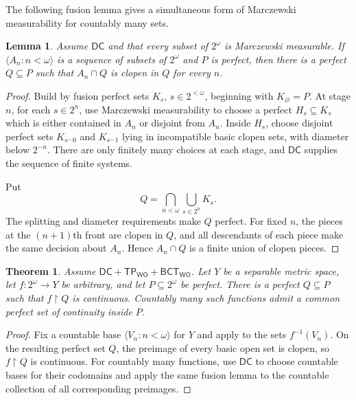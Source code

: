 \documentclass[11pt,reqno]{amsart}
\newcommand{\WO}{\mathsf{WO}}
\newcommand{\restr}{\mathbin{\upharpoonright}}
\newcommand{\BCTWO}{\mathsf{BCT}_{\WO}}
\newcommand{\TP}{\mathsf{TP}_{\WO}}
\theoremstyle{plain}
\newtheorem{theorem}{Theorem}[section]
\newtheorem{lemma}[lemma]{Lemma}
\theoremstyle{definition}
\theoremstyle{remark}
\begin{document}
The following fusion lemma gives a simultaneous form of Marczewski measurability for countably many sets.

\begin{lemma}\label{lem:simultaneous-fusion}
Assume $\mathsf{DC}$ and that every subset of $2^\omega$ is Marczewski
measurable.  If $\langle A_n:n<\omega\rangle$ is a sequence of subsets of
$2^\omega$ and $P$ is perfect, then there is a perfect $Q\subseteq P$ such
that $A_n\cap Q$ is clopen in $Q$ for every $n$.
\end{lemma}

\begin{proof}
Build by fusion perfect sets $K_s$, $s\in2^{<\omega}$, beginning with
$K_\varnothing=P$.  At stage $n$, for each $s\in2^n$, use Marczewski
measurability to choose a perfect $H_s\subseteq K_s$ which is either contained
in $A_n$ or disjoint from $A_n$.  Inside $H_s$, choose disjoint perfect sets
$K_{s^\frown0}$ and $K_{s^\frown1}$ lying in incompatible basic clopen sets,
with diameter below $2^{-n}$.  There are only finitely many choices at each
stage, and $\mathsf{DC}$ supplies the sequence of finite systems.

Put
\[
 Q=\bigcap_{n<\omega}\bigcup_{s\in2^n}K_s.
\]
The splitting and diameter requirements make $Q$ perfect.  For fixed $n$,
the pieces at the $(n+1)$th front are clopen in $Q$, and all descendants of
each piece make the same decision about $A_n$.  Hence $A_n\cap Q$ is a
finite union of clopen pieces.
\end{proof}


\begin{theorem}\label{thm:continuous-restriction}
Assume $\mathsf{DC}+\TP+\BCTWO$.  Let $Y$ be a separable metric space,
let $f:2^\omega\to Y$ be arbitrary, and let $P\subseteq2^\omega$ be perfect.
There is a perfect $Q\subseteq P$ such that $f\restr Q$ is continuous.
Countably many such functions admit a common perfect set of continuity inside
$P$.
\end{theorem}

\begin{proof}
Fix a countable base $\langle V_n:n<\omega\rangle$ for $Y$ and apply
 to the sets
$f^{-1}(V_n)$.  On the resulting perfect set $Q$, the preimage of every basic
open set is clopen, so $f\restr Q$ is continuous.  For countably many functions, use $\mathsf{DC}$ to choose countable bases for their codomains and apply the same fusion lemma to the countable collection of all corresponding
preimages.
\end{proof}
\end{document}
